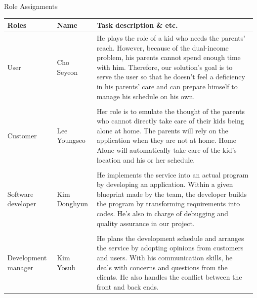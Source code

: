 \documentclass[conference]{IEEEtran}
\begin{document}
\large{Role Assignments}
\begin{table}[H]
\center
\begin{tabular}{m{1.7cm} m{1.6cm} m{3.5cm}}
\toprule
Roles & Name & Task description \& etc.\\
\midrule
User & Cho Seyeon & He plays the role of a kid who needs the parents’ reach. However, because of the dual-income problem, his parents cannot spend enough time with him. Therefore, our solution’s goal is to serve the user so that he doesn’t feel a deficiency in his parents’ care and can prepare himself to manage his schedule on his own. \\\\
Customer & Lee Youngseo & Her role is to emulate the thought of the parents who cannot directly take care of their kids being alone at home. The parents will rely on the application when they are not at home. Home Alone will automatically take care of the kid’s location and his or her schedule. \\\\
Software developer & Kim Donghyun & He implements the service into an actual program by developing an application. Within a given blueprint made by the team, the developer builds the program by transforming requirements into codes. He’s also in charge of debugging and quality assurance in our project. \\\\
Development manager & Kim Yosub & He plans the development schedule and arranges the service by adopting opinions from customers and users. With his communication skills, he deals with concerns and questions from the clients. He also handles the conflict between the front and back ends.  \\
\bottomrule
\end{tabular}
\end{table}
\newpage
    
\end{document}
